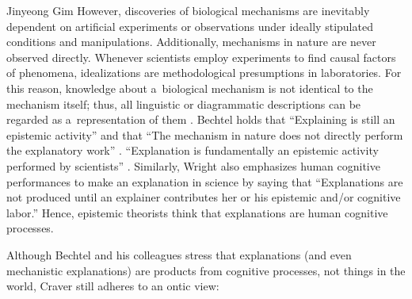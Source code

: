 \begin{artengenv}{Jinyeong Gim}
However, discoveries of biological mechanisms are inevitably dependent on artificial experiments or observations under ideally stipulated conditions and manipulations. Additionally, mechanisms in nature are never observed directly. Whenever scientists employ experiments to find causal factors of phenomena, idealizations are methodological presumptions in laboratories. For this reason, knowledge about a~biological mechanism is not identical to the mechanism itself; thus, all linguistic or diagrammatic descriptions can be regarded as a~representation of them
\parencites[][]{bechtel_explanation_2005}[][]{bechtel_mental_2008}. %
 Bechtel holds that ``Explaining is still an epistemic activity'' and that ``The mechanism in nature does not directly perform the explanatory work'' 
\parencite[][p.425]{bechtel_explanation_2005}. %
 ``Explanation is fundamentally an epistemic activity performed by scientists'' 
\parencite[][p.18]{bechtel_mental_2008}. %
 Similarly, Wright 
\parencite*[][]{wright_mechanistic_2012} %
 also emphasizes human cognitive performances to make an explanation in science by saying that ``Explanations are not produced until an explainer contributes her or his epistemic and/or cognitive labor.'' Hence, epistemic theorists think that explanations are human cognitive processes.

Although Bechtel and his colleagues stress that explanations (and even mechanistic explanations) are products from cognitive processes, not things in the world, Craver still adheres to an ontic view:


\end{artengenv}
